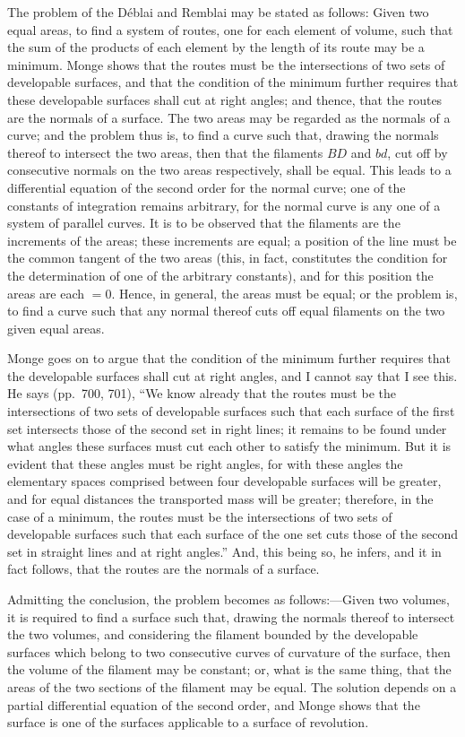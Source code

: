 \documentclass[11pt,a4paper]{book}
\begin{document}
The problem of the D\'{e}blai and Remblai may be stated as follows: Given two equal areas, to find a system of routes, one for each element of volume, such that the sum of the products of each element by the length of its route may be a minimum. Monge shows that the routes must be the intersections of two sets of developable surfaces, and that the condition of the minimum further requires that these developable surfaces shall cut at right angles; and thence, that the routes are the normals of a surface. The two areas may be regarded as the normals of a curve; and the problem thus is, to find a curve such that, drawing the normals thereof to intersect the two areas, then that the filaments $BD$ and $bd$, cut off by consecutive normals on the two areas respectively, shall be equal. This leads to a differential equation of the second order for the normal curve; one of the constants of integration remains arbitrary, for the normal curve is any one of a system of parallel curves. It is to be observed that the filaments are the increments of the areas; these increments are equal; a position of the line must be the common tangent of the two areas (this, in fact, constitutes the condition for the determination of one of the arbitrary constants), and for this position the areas are each $=0$. Hence, in general, the areas must be equal; or the problem is, to find a curve such that any normal thereof cuts off equal filaments on the two given equal areas.

Monge goes on to argue that the condition of the minimum further requires that the developable surfaces shall cut at right angles, and I cannot say that I see this. He says (pp.~700, 701), ``We know already that the routes must be the intersections of two sets of developable surfaces such that each surface of the first set intersects those of the second set in right lines; it remains to be found under what angles these surfaces must cut each other to satisfy the minimum. But it is evident that these angles must be right angles, for with these angles the elementary spaces comprised between four developable surfaces will be greater, and for equal distances the transported mass will be greater; therefore, in the case of a minimum, the routes must be the intersections of two sets of developable surfaces such that each surface of the one set cuts those of the second set in straight lines and at right angles.'' And, this being so, he infers, and it in fact follows, that the routes are the normals of a surface.

Admitting the conclusion, the problem becomes as follows:---Given two volumes, it is required to find a surface such that, drawing the normals thereof to intersect the two volumes, and considering the filament bounded by the developable surfaces which belong to two consecutive curves of curvature of the surface, then the volume of the filament may be constant; or, what is the same thing, that the areas of the two sections of the filament may be equal. The solution depends on a partial differential equation of the second order, and Monge shows that the surface is one of the surfaces applicable to a surface of revolution.
\end{document}
